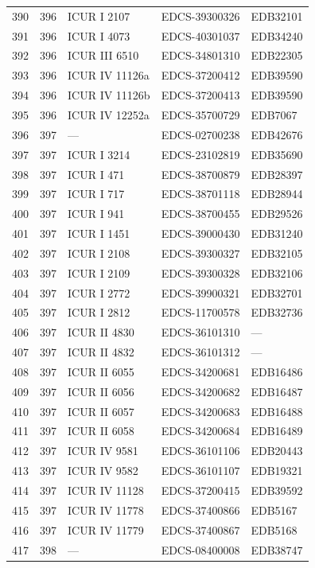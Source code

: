 \begin{longtable}{@{}r r l l l@{}}
390 & 396 & ICUR I 2107 & EDCS-39300326 & EDB32101 \\
391 & 396 & ICUR I 4073 & EDCS-40301037 & EDB34240 \\
392 & 396 & ICUR III 6510 & EDCS-34801310 & EDB22305 \\
393 & 396 & ICUR IV 11126a & EDCS-37200412 & EDB39590 \\
394 & 396 & ICUR IV 11126b & EDCS-37200413 & EDB39590 \\
395 & 396 & ICUR IV 12252a & EDCS-35700729 & EDB7067 \\
396 & 397 & — & EDCS-02700238 & EDB42676 \\
397 & 397 & ICUR I 3214 & EDCS-23102819 & EDB35690 \\
398 & 397 & ICUR I 471 & EDCS-38700879 & EDB28397 \\
399 & 397 & ICUR I 717 & EDCS-38701118 & EDB28944 \\
400 & 397 & ICUR I 941 & EDCS-38700455 & EDB29526 \\
401 & 397 & ICUR I 1451 & EDCS-39000430 & EDB31240 \\
402 & 397 & ICUR I 2108 & EDCS-39300327 & EDB32105 \\
403 & 397 & ICUR I 2109 & EDCS-39300328 & EDB32106 \\
404 & 397 & ICUR I 2772 & EDCS-39900321 & EDB32701 \\
405 & 397 & ICUR I 2812 & EDCS-11700578 & EDB32736 \\
406 & 397 & ICUR II 4830 & EDCS-36101310 & — \\
407 & 397 & ICUR II 4832 & EDCS-36101312 & — \\
408 & 397 & ICUR II 6055 & EDCS-34200681 & EDB16486 \\
409 & 397 & ICUR II 6056 & EDCS-34200682 & EDB16487 \\
410 & 397 & ICUR II 6057 & EDCS-34200683 & EDB16488 \\
411 & 397 & ICUR II 6058 & EDCS-34200684 & EDB16489 \\
412 & 397 & ICUR IV 9581 & EDCS-36101106 & EDB20443 \\
413 & 397 & ICUR IV 9582 & EDCS-36101107 & EDB19321 \\
414 & 397 & ICUR IV 11128 & EDCS-37200415 & EDB39592 \\
415 & 397 & ICUR IV 11778 & EDCS-37400866 & EDB5167 \\
416 & 397 & ICUR IV 11779 & EDCS-37400867 & EDB5168 \\
417 & 398 & — & EDCS-08400008 & EDB38747 \\

\end{longtable}
